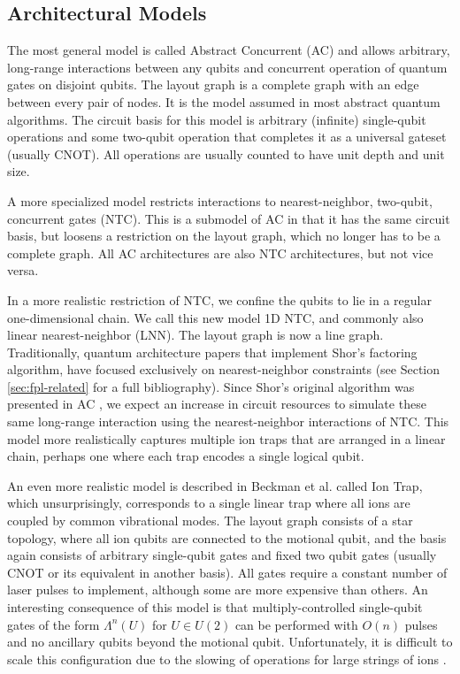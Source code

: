 \subsection{Architectural Models}
\label{subsec:models}

The most general model is called Abstract Concurrent (\textsf{AC})
and allows arbitrary, long-range interactions between any qubits and concurrent
operation of quantum gates on disjoint qubits.
The layout graph is a complete graph with an edge between every pair of nodes.
It is the model assumed in most abstract quantum algorithms. 
The circuit basis
for this model is arbitrary (infinite) single-qubit operations and some
two-qubit operation that completes it as a universal gateset (usually CNOT).
All operations are usually counted to have unit depth and unit size.

A more specialized model restricts interactions to nearest-neighbor, two-qubit,
concurrent gates (\textsf{NTC}). This is a submodel of \textsf{AC} in that it
has the same circuit basis, but loosens a restriction on the layout graph,
which no longer has to be a complete graph. All \textsf{AC} architectures
are also \textsf{NTC} architectures, but not vice versa.

In a more realistic restriction of \textsf{NTC}, we confine the qubits to
lie in a regular one-dimensional chain. We call this new model
\textsf{1D NTC}, and commonly also 
linear nearest-neighbor (\textsf{LNN}).
The layout graph is now a line graph.
Traditionally, quantum architecture papers that
implement Shor's factoring algorithm, have focused exclusively on
nearest-neighbor constraints (see Section \ref{sec:fpl-related} for a full
bibliography). Since Shor's original algorithm was
presented in \textsf{AC} \cite{Shor1994}, we expect an increase in circuit resources to
simulate these same long-range interaction using the nearest-neighbor
interactions of \textsf{NTC}. This model more realistically captures multiple
ion traps that are arranged in a linear chain, perhaps one where each
trap encodes a single logical qubit.

An even more realistic model is described in Beckman et al.
\cite{Beckman1996} called \textsf{Ion Trap}, which unsurprisingly,
corresponds to a single linear trap where all ions are coupled by
common vibrational modes\cite{Cirac1995}.
The layout graph consists of a star topology,
where all ion qubits are connected to the motional qubit, and the basis
again consists of arbitrary single-qubit gates and fixed two qubit
gates (usually CNOT or its equivalent in another basis). All gates require
a constant number of laser pulses to implement, although some are more
expensive than others. An interesting consequence of this model is that
multiply-controlled single-qubit gates of the form $\Lambda^n(U)$ for
$U \in U(2)$ can be performed with $O(n)$ pulses and no ancillary qubits
beyond the motional qubit. Unfortunately, it is difficult to scale
this configuration due to the slowing of operations for large strings of
ions \cite{Haffner2008}.

